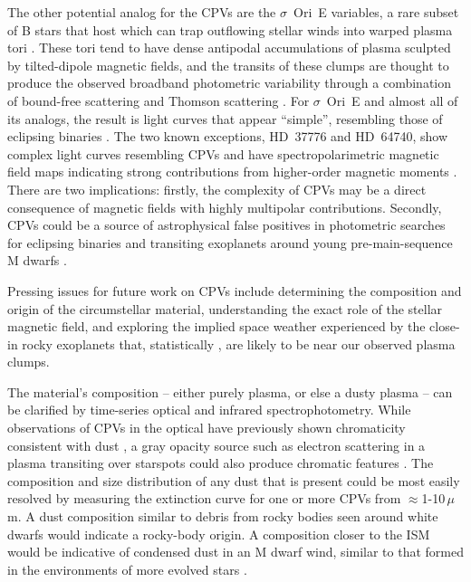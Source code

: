 \documentclass{nature3}
\begin{document}
The other potential analog for the CPVs are the $\sigma$~Ori~E
variables, a rare subset of B stars that host which can trap outflowing stellar winds into
warped plasma tori \cite{Townsend2005,Townsend2008}.  These tori tend
to have dense antipodal accumulations of plasma sculpted by
tilted-dipole magnetic fields, and the transits of
these clumps are thought to produce the observed broadband photometric variability
through a combination of bound-free scattering \cite{Townsend2005} and
Thomson scattering \cite{Berry2022}.  For $\sigma$~Ori~E and almost
all of its analogs, the result is light curves that appear ``simple'',
resembling those of eclipsing binaries \cite{Townsend2008}.  The two known
exceptions, HD~37776 and HD~64740, show complex light curves
resembling CPVs \cite{Mikulasek2020,Bouma2024} and have
spectropolarimetric magnetic field maps indicating strong
contributions from higher-order magnetic moments
\cite{Kochukhov2011,Shultz2018}.  There are two implications: firstly,
the complexity of CPVs may be a direct consequence of magnetic fields
with highly multipolar contributions.  Secondly, CPVs could be a
source of astrophysical false positives in photometric searches for
eclipsing binaries and transiting exoplanets around young
pre-main-sequence M dwarfs \cite{Johns-Krull2016,Bouma2020}.

Pressing issues for future work on CPVs include determining the
composition and origin of the circumstellar material, understanding
the exact role of the stellar magnetic field, and exploring the
implied space weather experienced by the close-in rocky exoplanets
that, statistically \cite{Dressing2015}, are likely to be near our
observed plasma clumps.

The material's composition -- either purely plasma, or else a dusty
plasma -- can be clarified by time-series optical and infrared
spectrophotometry.  While observations of CPVs in the optical have
previously shown chromaticity consistent with dust \cite{Gunther2022,Koen2023},
a gray opacity source such as electron scattering in a plasma
transiting over starspots could also produce chromatic features
\cite{Rackham2018}.  The composition and size distribution of any dust
that is present could be most easily resolved by measuring the
extinction curve for one or more CPVs from $\approx$1-10\,$\mu$m.  A
dust composition similar to debris from rocky bodies seen around white
dwarfs \cite{Reach2009} would indicate a rocky-body origin.  A 
composition closer to the ISM would be indicative of condensed dust in
an M dwarf wind, similar to that formed in the environments of more
evolved stars \cite{Marigo2008}.
\end{document}
